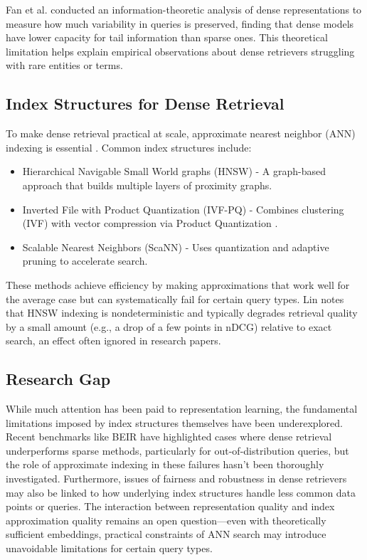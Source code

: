 \documentclass[manuscript]{acmart}
\begin{document}
Fan et al. \cite{fan2022information} conducted an information-theoretic analysis of dense representations to measure how much variability in queries is preserved, finding that dense models have lower capacity for tail information than sparse ones. This theoretical limitation helps explain empirical observations about dense retrievers struggling with rare entities or terms.

\subsection{Index Structures for Dense Retrieval}
To make dense retrieval practical at scale, approximate nearest neighbor (ANN) indexing is essential \cite{johnson2019billion}. Common index structures include:
\begin{itemize}
\item Hierarchical Navigable Small World graphs (HNSW) \cite{malkov2019efficient} - A graph-based approach that builds multiple layers of proximity graphs.
\item Inverted File with Product Quantization (IVF-PQ) - Combines clustering (IVF) with vector compression via Product Quantization \cite{jegou2010product}.
\item Scalable Nearest Neighbors (ScaNN) - Uses quantization and adaptive pruning to accelerate search.
\end{itemize}

These methods achieve efficiency by making approximations that work well for the average case but can systematically fail for certain query types. Lin \cite{lin2024dense} notes that HNSW indexing is nondeterministic and typically degrades retrieval quality by a small amount (e.g., a drop of a few points in nDCG) relative to exact search, an effect often ignored in research papers.

\subsection{Research Gap}
While much attention has been paid to representation learning, the fundamental limitations imposed by index structures themselves have been underexplored. Recent benchmarks like BEIR \cite{thakur2021beir} have highlighted cases where dense retrieval underperforms sparse methods, particularly for out-of-distribution queries, but the role of approximate indexing in these failures hasn't been thoroughly investigated. Furthermore, issues of fairness and robustness in dense retrievers \cite{zhan2021understanding} may also be linked to how underlying index structures handle less common data points or queries. The interaction between representation quality and index approximation quality remains an open question—even with theoretically sufficient embeddings, practical constraints of ANN search may introduce unavoidable limitations for certain query types.
\end{document}
